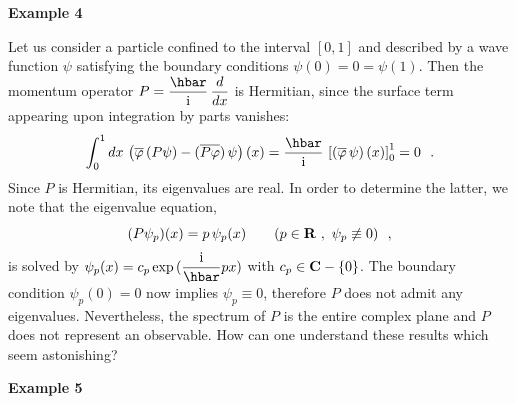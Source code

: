 \documentclass[12pt]{report}
\begin{document}
\bigskip



\noindent 
{\bf Example 4}
 
\medskip

Let us consider a particle confined to the interval
$[0,1]$ and described by a wave function $\psi$
satisfying the boundary conditions $\psi(0) =0=\psi(1)$.
Then the momentum operator $P=\ds{\hbar \over \ri} \,
\ds{d \over dx}$ is Hermitian, since the surface term
appearing upon integration by parts vanishes:
\begin{equation}
\label{itg}
\int_0^1 dx \, \left( \overline{\varphi} \,
(P\psi) -
(\overline{P\varphi} ) \, \psi \right) (x)
=
\ds{\hbar \over \ri} \, \left[ \left(
\overline{\varphi} \, \psi \right) (x) \right] _{0}^{1} = 0
\ \ .
\end{equation}
Since $P$ is Hermitian, its eigenvalues are real.
In order to determine the latter, we note that the
eigenvalue equation,
\[
(P \psi_p)(x) = p \,  \psi_p(x)
\qquad (p \in {\bf R} \ , \ \psi_p \not \equiv 0)
\ \ ,
\]
is solved by
$\psi_p (x)= c_p \, {\rm exp} \, ( \ds{\ri \over \hbar} px )$ 
with $c_p \in {\bf C} - \{ 0 \}$.
The boundary condition $\psi_p (0) =0$ now implies
$\psi_p \equiv 0$, therefore $P$ does not admit any eigenvalues.
Nevertheless, the spectrum
of $P$ is the entire complex plane  \cite{sg}
and $P$ does not represent an observable.
How can one understand these results
which seem astonishing?
 
 
\bigskip
 
\noindent 
{\bf Example 5}
 
\medskip
\end{document}
